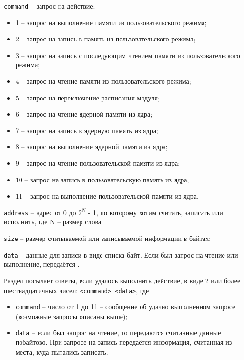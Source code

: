 \documentclass[oneside,senior,etd]{BYUPhys}
\begin{document}
\begin{compactlist}
  \item \texttt{command} -- запрос на действие:
  \begin{itemize}
    \item 1 -- запрос на выполнение памяти из пользовательского режима;
    \item 2 -- запрос на запись в память из пользовательского режима;
    \item 3 -- запрос на запись с последующим чтением памяти из пользовательского режима;
    \item 4 -- запрос на чтение памяти из пользовательского режима;
    \item 5 -- запрос на переключение расписания модуля;
    \item 6 -- запрос на чтение ядерной памяти из ядра;
    \item 7 -- запрос на запись в ядерную память из ядра;
    \item 8 -- запрос на выполнение ядерной памяти из ядра;
    \item 9 -- запрос на чтение пользовательской памяти из ядра;
    \item 10 -- запрос на запись в пользовательскую память из ядра;
    \item 11 -- запрос на выполнение пользовательской памяти из ядра.
  \end{itemize}

  \item \texttt{address} -- адрес от 0 до \begin{math} 2^N \end{math} - 1, по которому хотим считать, записать или исполнить, где N -- размер слова;
  \item \texttt{size} -- размер считываемой или записываемой информации в байтах;
  \item \texttt{data} -- данные для записи в виде списка байт. Если был запрос на чтение или выполнение, передаётся \dq.

\end{compactlist}

Раздел посылает ответы, если удалось выполнить действие, в виде 2 или более шестнадцатичных чисел:
\dq\texttt{<command> <data>}\dq, где

\begin{itemize}
  \item \texttt{command} -- число от 1 до 11 -- сообщение об удачно выполненном запросе (возможные запросы описаны выше);
  \item \texttt{data} -- если был запрос на чтение, то передаются считанные данные побайтово.
  При запросе на запись передаётся информация, считанная из места, куда пытались записать.
\end{itemize}
\end{document}

